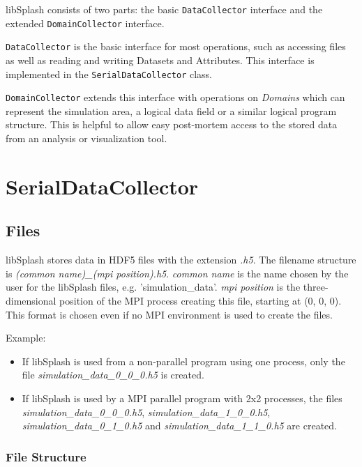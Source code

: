 \documentclass[a4paper,10pt,BCOR12mm]{report}
\begin{document}
libSplash consists of two parts: the basic \texttt{DataCollector} interface and the extended \texttt{DomainCollector} interface.

\texttt{DataCollector} is the basic interface for most operations, such as accessing files as well as reading and writing Datasets and Attributes.
This interface is implemented in the \texttt{SerialDataCollector} class.

\texttt{DomainCollector} extends this interface with operations on \emph{Domains} which can represent the simulation area,
a logical data field or a similar logical program structure. This is helpful to allow easy post-mortem access to the stored data from
an analysis or visualization tool.


\chapter{SerialDataCollector}

\section{Files}

libSplash stores data in HDF5 files with the extension \emph{.h5}.
The filename structure is \emph{(common name)\_(mpi position).h5}.
\emph{common name} is the name chosen by the user for the libSplash files, e.g.
'simulation\_data'.
\emph{mpi position} is the three-dimensional position of the MPI process creating this
file, starting at (0, 0, 0).
This format is chosen even if no MPI environment is used to create the files.

Example:
\begin{itemize}
	\item If libSplash is used from a non-parallel program using one process, only the file \emph{simulation\_data\_0\_0\_0.h5} is created.

	\item If libSplash is used by a MPI parallel program with 2x2 processes, the files
	\emph{simulation\_data\_0\_0\_0.h5}, \emph{simulation\_data\_1\_0\_0.h5},
	\emph{simulation\_data\_0\_1\_0.h5} and \emph{simulation\_data\_1\_1\_0.h5} are created.
\end{itemize}

\subsection{File Structure}
\end{document}
